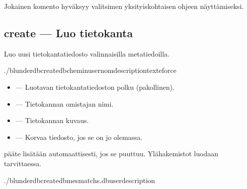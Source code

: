 \documentclass[letterpaper,10pt,finnish]{sphinxmanual}
\begin{document}
\sphinxAtStartPar
Jokainen komento hyväksyy \sphinxhyphen{}valitsimen yksityiskohtaisen ohjeen näyttämiseksi.


\subsection{create — Luo tietokanta}
\label{\detokenize{cli:create-creer-une-base-de-donnees}}
\sphinxAtStartPar
Luo uusi tietokantatiedosto valinnaisilla metatiedoilla.

\begin{sphinxVerbatim}[commandchars=\\\{\}]
./blunderdbcreate\PYGZhy{}\PYGZhy{}db\PYGZlt{}chemin\PYGZgt{}\PYG{o}{[}\PYGZhy{}\PYGZhy{}user\PYGZlt{}nom\PYGZgt{}\PYG{o}{]}\PYG{o}{[}\PYGZhy{}\PYGZhy{}description\PYGZlt{}texte\PYGZgt{}\PYG{o}{]}\PYG{o}{[}\PYGZhy{}\PYGZhy{}force\PYG{o}{]}
\end{sphinxVerbatim}

\sphinxAtStartPar
{}
\begin{itemize}
\item {} 
\sphinxAtStartPar
{} — Luotavan tietokantatiedoston polku (pakollinen).

\item {} 
\sphinxAtStartPar
{} — Tietokannan omistajan nimi.

\item {} 
\sphinxAtStartPar
{} — Tietokannan kuvaus.

\item {} 
\sphinxAtStartPar
{} — Korvaa tiedosto, jos se on jo olemassa.

\end{itemize}

\sphinxAtStartPar
{}\sphinxhyphen{}pääte lisätään automaattisesti, jos se puuttuu. Ylähakemistot luodaan tarvittaessa.

\sphinxAtStartPar
{}

\begin{sphinxVerbatim}[commandchars=\\\{\}]
./blunderdbcreate\PYGZhy{}\PYGZhy{}dbmes\PYGZus{}matchs.db\PYGZhy{}\PYGZhy{}user\PYGZhy{}\PYGZhy{}description
\end{sphinxVerbatim}
\end{document}
